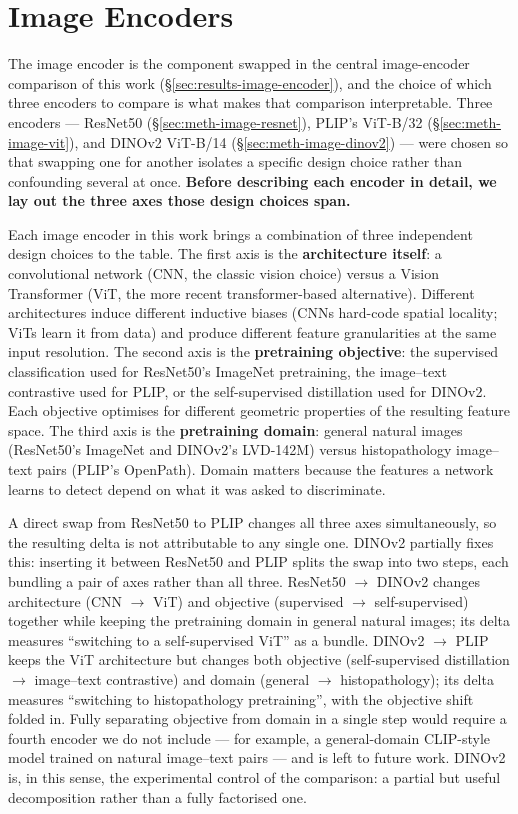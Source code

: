 \section{Image Encoders}
\label{sec:meth-image}

The image encoder is the component swapped in the central image-encoder comparison of this work (§\ref{sec:results-image-encoder}), and the choice of which three encoders to compare is what makes that comparison interpretable. Three encoders --- ResNet50 (§\ref{sec:meth-image-resnet}), PLIP's ViT-B/32 (§\ref{sec:meth-image-vit}), and DINOv2 ViT-B/14 (§\ref{sec:meth-image-dinov2}) --- were chosen so that swapping one for another isolates a specific design choice rather than confounding several at once. \textbf{Before describing each encoder in detail, we lay out the three axes those design choices span.}

Each image encoder in this work brings a combination of three independent design choices to the table. The first axis is the \textbf{architecture itself}: a convolutional network (CNN, the classic vision choice) versus a Vision Transformer (ViT, the more recent transformer-based alternative). Different architectures induce different inductive biases (CNNs hard-code spatial locality; ViTs learn it from data) and produce different feature granularities at the same input resolution. The second axis is the \textbf{pretraining objective}: the supervised classification used for ResNet50's ImageNet pretraining, the image--text contrastive used for PLIP, or the self-supervised distillation used for DINOv2. Each objective optimises for different geometric properties of the resulting feature space. The third axis is the \textbf{pretraining domain}: general natural images (ResNet50's ImageNet and DINOv2's LVD-142M) versus histopathology image--text pairs (PLIP's OpenPath). Domain matters because the features a network learns to detect depend on what it was asked to discriminate.

A direct swap from ResNet50 to PLIP changes all three axes simultaneously, so the resulting delta is not attributable to any single one. DINOv2 partially fixes this: inserting it between ResNet50 and PLIP splits the swap into two steps, each bundling a pair of axes rather than all three. ResNet50 $\rightarrow$ DINOv2 changes architecture (CNN $\rightarrow$ ViT) and objective (supervised $\rightarrow$ self-supervised) together while keeping the pretraining domain in general natural images; its delta measures ``switching to a self-supervised ViT'' as a bundle. DINOv2 $\rightarrow$ PLIP keeps the ViT architecture but changes both objective (self-supervised distillation $\rightarrow$ image--text contrastive) and domain (general $\rightarrow$ histopathology); its delta measures ``switching to histopathology pretraining'', with the objective shift folded in. Fully separating objective from domain in a single step would require a fourth encoder we do not include --- for example, a general-domain CLIP-style model trained on natural image--text pairs --- and is left to future work. DINOv2 is, in this sense, the experimental control of the comparison: a partial but useful decomposition rather than a fully factorised one.

